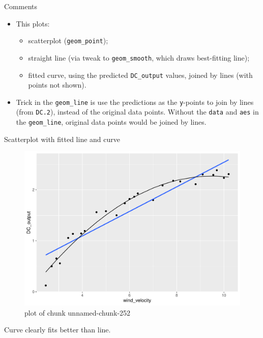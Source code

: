 \documentclass[
  ignorenonframetext,
]{beamer}
\providecommand{\tightlist}{%
  \setlength{\itemsep}{0pt}\setlength{\parskip}{0pt}}
\begin{document}
\begin{frame}[fragile]{Comments}
\protect\hypertarget{comments-15}{}

\begin{itemize}
\tightlist
\item
  This plots:

  \begin{itemize}
  \tightlist
  \item
    scatterplot (\texttt{geom\_point});
  \item
    straight line (via tweak to \texttt{geom\_smooth}, which draws
    best-fitting line);
  \item
    fitted curve, using the predicted \texttt{DC\_output} values, joined
    by lines (with points not shown).
  \end{itemize}
\item
  Trick in the \texttt{geom\_line} is use the predictions as the
  \texttt{y}-points to join by lines (from \texttt{DC.2}), instead of
  the original data points. Without the \texttt{data} and \texttt{aes}
  in the \texttt{geom\_line}, original data points would be joined by
  lines.
\end{itemize}

\end{frame}

\begin{frame}{Scatterplot with fitted line and curve}
\protect\hypertarget{scatterplot-with-fitted-line-and-curve-1}{}

\begin{figure}
\centering
\includegraphics{figure/unnamed-chunk-252-1.pdf}
\caption{plot of chunk unnamed-chunk-252}
\end{figure}

Curve clearly fits better than line.

\end{frame}
\end{document}

